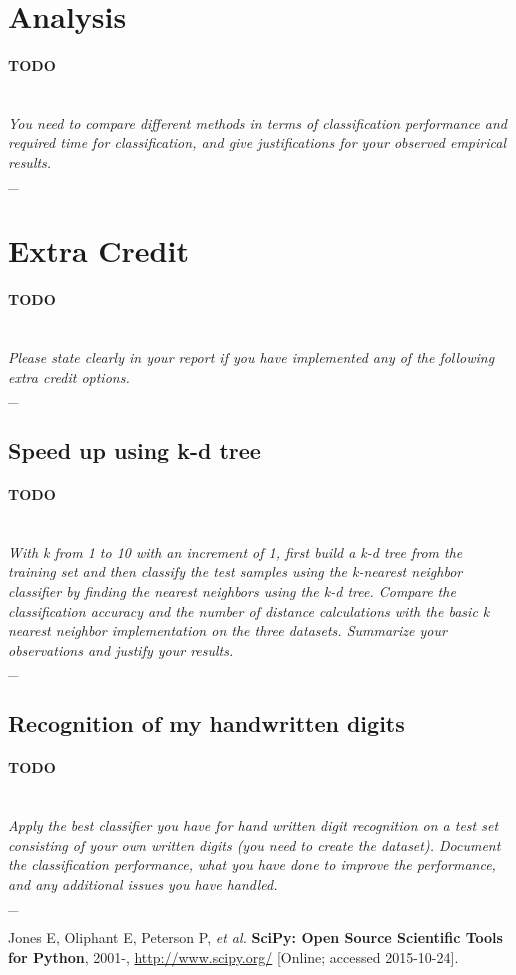 \documentclass{article}
\newcommand{\outline}[2]{\paragraph{\textsc{#1}}\hrulefill~\\{\small\it #2}\\\_\hrulefill~\\}
\newcommand{\todo}[1]{\outline{\large TODO}{#1}}
\begin{document}
\section{Analysis}
\todo{You need to compare different methods in terms of classification performance and required time for classification, and give justifications for your observed empirical results.}


\section{Extra Credit}
\todo{Please state clearly in your report if you have implemented any of the following extra
credit options.}

\subsection{Speed up using k-d tree}
\todo{With k from 1 to 10 with an increment of 1, first build a k-d tree from the training set and then classify the test samples using the k-nearest neighbor classifier by finding the nearest neighbors using the k-d tree. Compare the classification accuracy and the number of distance calculations with the basic k nearest neighbor implementation on the three datasets. Summarize your observations and justify your results.}

\subsection{Recognition of my handwritten digits}
\todo{Apply the best classifier you have for hand written digit recognition on a test set consisting of your own written digits (you need to create the dataset). Document the classification performance, what you have done to improve the performance, and any additional issues you have handled.}


\begin{thebibliography}{9}

    Jones E, Oliphant E, Peterson P, \emph{et al.}
    {\bf SciPy: Open Source Scientific Tools for Python}, 2001-,
    \url{http://www.scipy.org/} [Online; accessed 2015-10-24].

\end{thebibliography}

\end{document}
